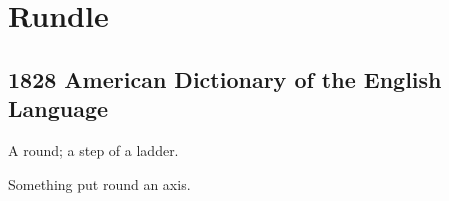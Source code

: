 \section{Rundle}
	\label{RUNDLE}
	

\subsection{1828 American Dictionary of the English Language} %
	\label{RUNDLE-1828}

	\begin{compactitem}
		\item[1] A round; a step of a ladder.
		\item[2] Something put round an axis.
	\end{compactitem}




	
	

